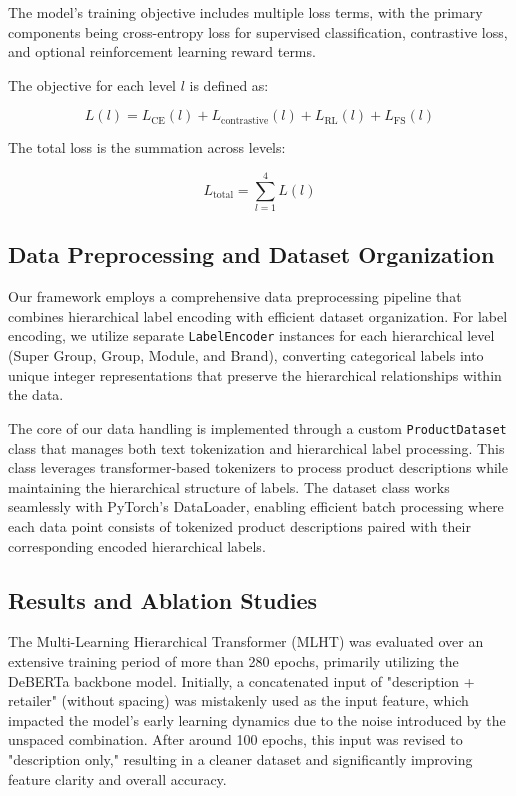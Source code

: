 \documentclass[9pt,a4paper,twoside]{rho-class/rho}
\begin{document}
The model’s training objective includes multiple loss terms, with the primary components being cross-entropy loss for supervised classification, contrastive loss, and optional reinforcement learning reward terms.

The objective for each level \( l \) is defined as:

\[ \label{eq:level_loss}
L(l) = L_{\text{CE}}(l) + L_{\text{contrastive}}(l) + L_{\text{RL}}(l) + L_{\text{FS}}(l)
\]

The total loss is the summation across levels:

\[ \label{eq:total_loss}
L_{\text{total}} = \sum_{l=1}^{4} L(l)
\]
        
    \subsection{Data Preprocessing and Dataset Organization}

       Our framework employs a comprehensive data preprocessing pipeline that combines hierarchical label encoding with efficient dataset organization. For label encoding, we utilize separate \verb|LabelEncoder| instances for each hierarchical level (Super Group, Group, Module, and Brand), converting categorical labels into unique integer representations that preserve the hierarchical relationships within the data.

The core of our data handling is implemented through a custom \verb|ProductDataset| class that manages both text tokenization and hierarchical label processing. This class leverages transformer-based tokenizers to process product descriptions while maintaining the hierarchical structure of labels. The dataset class works seamlessly with PyTorch's DataLoader, enabling efficient batch processing where each data point consists of tokenized product descriptions paired with their corresponding encoded hierarchical labels.

    \subsection{Results and Ablation Studies}

       The Multi-Learning Hierarchical Transformer (MLHT) was evaluated over an extensive training period of more than 280 epochs, primarily utilizing the DeBERTa backbone model. Initially, a concatenated input of "description + retailer" (without spacing) was mistakenly used as the input feature, which impacted the model’s early learning dynamics due to the noise introduced by the unspaced combination. After around 100 epochs, this input was revised to "description only," resulting in a cleaner dataset and significantly improving feature clarity and overall accuracy.
\end{document}
